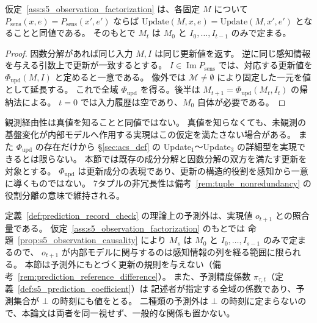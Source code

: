 \begin{proposition}[観測経由性の検査条件と内部モデルの因果性]
\label{prop:s5_observation_causality}
仮定~\ref{ass:s5_observation_factorization} は、各固定 $M$ について $P_{\mathrm{sens}}(x,e)=P_{\mathrm{sens}}(x',e')$ ならば
$\mathrm{Update}(M,x,e)=\mathrm{Update}(M,x',e')$ となることと同値である。
そのもとで $M_t$ は $M_0$ と $I_0,\ldots,I_{t-1}$ のみで定まる。
\end{proposition}
\begin{proof}
因数分解があれば同じ入力 $M,I$ は同じ更新値を返す。
逆に同じ感知情報を与える引数上で更新が一致するとする。
$I\in\operatorname{Im}P_{\mathrm{sens}}$ では、対応する更新値を $\Phi_{\mathrm{upd}}(M,I)$ と定めると一意である。
像外では $\mathcal M\ne\emptyset$ により固定した一元を値として延長する。
これで全域 $\Phi_{\mathrm{upd}}$ を得る。後半は $M_{t+1}=\Phi_{\mathrm{upd}}(M_t,I_t)$ の帰納法による。
$t=0$ では入力履歴は空であり、$M_0$ 自体が必要である。
\end{proof}

\begin{remark}[因数分解の射程]
\label{rem:s5_observation_scope}
観測経由性は真値を知ることと同値ではない。
真値を知らなくても、未観測の基盤変化が内部モデルへ作用する実現はこの仮定を満たさない場合がある。
また $\Phi_{\mathrm{upd}}$ の存在だけから \S\ref{sec:acs_def} の Update$_1$〜Update$_3$ の詳細型を実現できるとは限らない。
本節では既存の成分分解と因数分解の双方を満たす更新を対象とする。
$\Phi_{\mathrm{upd}}$ は更新成分の表現であり、更新の構造的役割を感知から一意に導くものではない。
7タプルの非冗長性は備考~\ref{rem:tuple_nonredundancy} の役割分離の意味で維持される。
\end{remark}

\begin{remark}[予測外と内部モデルの更新]
\label{rem:s5_prediction_learning}
定義~\ref{def:prediction_record_check} の理論上の予測外は、実現値 $o_{t+1}$ との照合量である。
仮定~\ref{ass:s5_observation_factorization} のもとでは
命題~\ref{prop:s5_observation_causality} により $M_s$ は $M_0$ と $I_0,\ldots,I_{s-1}$ のみで定まるので、
$o_{t+1}$ が内部モデルに関与するのは感知情報の列を経る範囲に限られる。
本節は予測外にもとづく更新の規則を与えない（備考~\ref{rem:prediction_reference_difference}）。
また、予測精度係数 $\pi_{\tau,t}$（定義~\ref{def:s5_prediction_coefficient}）は
記述者が指定する全域の係数であり、予測集合が $\bot$ の時刻にも値をとる。
二種類の予測外は $\bot$ の時刻に定まらないので、本論文は両者を同一視せず、一般的な関係も置かない。
\end{remark}

